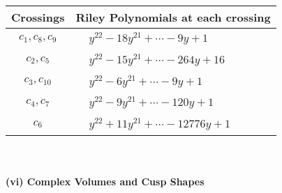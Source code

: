 \documentclass[1p]{elsarticle_modified}
\theoremstyle{definition}
\begin{document}
\begin{tabular}{m{50pt}|m{274pt}}
Crossings & \hspace{64pt}Riley Polynomials at each crossing \\
\hline $$\begin{aligned}c_{1},c_{8},c_{9}\end{aligned}$$&$\begin{aligned}
&y^{22}-18 y^{21}+\cdots-9 y+1
\end{aligned}$\\
\hline $$\begin{aligned}c_{2},c_{5}\end{aligned}$$&$\begin{aligned}
&y^{22}-15 y^{21}+\cdots-264 y+16
\end{aligned}$\\
\hline $$\begin{aligned}c_{3},c_{10}\end{aligned}$$&$\begin{aligned}
&y^{22}-6 y^{21}+\cdots-9 y+1
\end{aligned}$\\
\hline $$\begin{aligned}c_{4},c_{7}\end{aligned}$$&$\begin{aligned}
&y^{22}-9 y^{21}+\cdots-120 y+1
\end{aligned}$\\
\hline $$\begin{aligned}c_{6}\end{aligned}$$&$\begin{aligned}
&y^{22}+11 y^{21}+\cdots-12776 y+1
\end{aligned}$\\
\hline
\end{tabular}\\~\\
\newpage\flushleft \textbf{(vi) Complex Volumes and Cusp Shapes}
\end{document}
